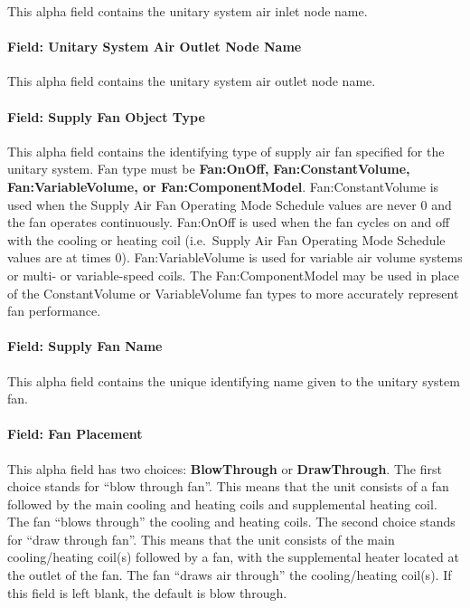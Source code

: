This alpha field contains the unitary system air inlet node name.

\paragraph{Field: Unitary System Air Outlet Node Name}\label{field-unitary-system-air-outlet-node-name}

This alpha field contains the unitary system air outlet node name.

\paragraph{Field: Supply Fan Object Type}\label{field-supply-fan-object-type-000}

This alpha field contains the identifying type of supply air fan specified for the unitary system. Fan type must be \textbf{Fan:OnOff,} \textbf{Fan:ConstantVolume, Fan:VariableVolume, or Fan:ComponentModel}. Fan:ConstantVolume is used when the Supply Air Fan Operating Mode Schedule values are never 0 and the fan operates continuously. Fan:OnOff is used when the fan cycles on and off with the cooling or heating coil (i.e.~Supply Air Fan Operating Mode Schedule values are at times 0). Fan:VariableVolume is used for variable air volume systems or multi- or variable-speed coils. The Fan:ComponentModel may be used in place of the ConstantVolume or VariableVolume fan types to more accurately represent fan performance.

\paragraph{Field: Supply Fan Name}\label{field-supply-fan-name}

This alpha field contains the unique identifying name given to the unitary system fan.

\paragraph{Field: Fan Placement}\label{field-fan-placement}

This alpha field has two choices: \textbf{BlowThrough} or \textbf{DrawThrough}. The first choice stands for ``blow through fan''. This means that the unit consists of a fan followed by the main cooling and heating coils and supplemental heating coil. The fan ``blows through'' the cooling and heating coils. The second choice stands for ``draw through fan''. This means that the unit consists of the main cooling/heating coil(s) followed by a fan, with the supplemental heater located at the outlet of the fan. The fan ``draws air through'' the cooling/heating coil(s). If this field is left blank, the default is blow through.

